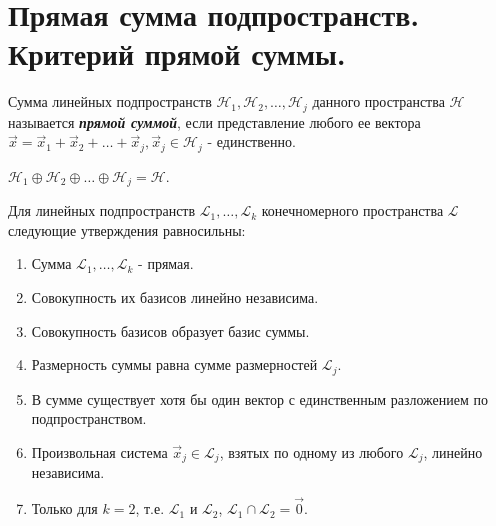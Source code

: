 \section{
    Прямая сумма подпространств. Критерий прямой суммы.
}

\begin{definition}
    Сумма линейных подпространств $\mathcal{H}_1, \mathcal{H}_2, \ldots, \mathcal{H}_j$ данного пространства $\mathcal{H}$ называется \textbf{\textit{прямой суммой}}, если представление любого ее вектора $\vec{x} = \vec{x}_1 + \vec{x}_2 + \ldots + \vec{x}_j, \vec{x}_j \in \mathcal{H}_j$ - единственно.
\end{definition}

\begin{designation}
    $\mathcal{H}_1 \oplus \mathcal{H}_2 \oplus \ldots \oplus \mathcal{H}_j = \mathcal{H}$.
\end{designation}

\begin{theorem}
    Для линейных подпространств $\mathcal{L}_1, \ldots, \mathcal{L}_k$ конечномерного пространства $\mathcal{L}$ следующие утверждения равносильны:
    \begin{enumerate}
        \item Сумма $\mathcal{L}_1, \ldots, \mathcal{L}_k$ - прямая.
        \item Совокупность их базисов линейно независима.
        \item Совокупность базисов образует базис суммы.
        \item Размерность суммы равна сумме размерностей $\mathcal{L}_j$.
        \item В сумме существует хотя бы один вектор с единственным разложением по подпространством.
        \item Произвольная система $\vec{x}_j \in \mathcal{L}_j$, взятых по одному из любого $\mathcal{L}_j$, линейно независима.
        \item Только для $k = 2$, т.е. $\mathcal{L}_1$ и $\mathcal{L}_2$, $\mathcal{L}_1 \cap \mathcal{L}_2 = \vec{0}$.
    \end{enumerate}
\end{theorem}

